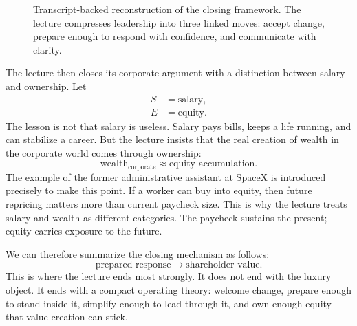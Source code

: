 \begin{figure}[h]
\centering
{}
\caption{Transcript-backed reconstruction of the closing framework. The lecture compresses leadership into three linked moves: accept change, prepare enough to respond with confidence, and communicate with clarity.}
\end{figure}

The lecture then closes its corporate argument with a distinction between salary and ownership. Let
\begin{align}
S &= \text{salary},\\
E &= \text{equity}.
\end{align}
The lesson is not that salary is useless. Salary pays bills, keeps a life running, and can stabilize a career. But the lecture insists that the real creation of wealth in the corporate world comes through ownership:
\begin{equation}
\text{wealth}_{\text{corporate}} \approx \text{equity accumulation}.
\end{equation}
The example of the former administrative assistant at SpaceX is introduced precisely to make this point. If a worker can buy into equity, then future repricing matters more than current paycheck size. This is why the lecture treats salary and wealth as different categories. The paycheck sustains the present; equity carries exposure to the future.

We can therefore summarize the closing mechanism as follows:
\begin{equation}
\text{prepared response} \rightarrow \text{shareholder value}.
\end{equation}
This is where the lecture ends most strongly. It does not end with the luxury object. It ends with a compact operating theory: welcome change, prepare enough to stand inside it, simplify enough to lead through it, and own enough equity that value creation can stick.

